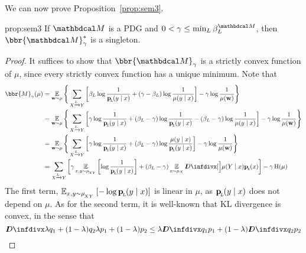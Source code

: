 We can now prove         Proposition~\ref{prop:sem3}.
\begin{old}{prop:sem3}
If $\dg M$ is a PDG and
$0 < \gamma
\leq \min_L \beta_L^{\dg M}$, then
$\bbr{\dg M}_\gamma^*$ is a singleton.
\end{old}

\begin{proof}
It suffices to show that $\bbr{\dg
			  M}_\gamma$ is a strictly convex function of $\mu$,
since every strictly convex function has a unique minimum.
Note that
	\begin{align*}
		\bbr{M}_\gamma(\mu) 
			&= \E_{\mat w \sim \mu} \Bigg\{   \sum_{ X \xrightarrow{\!\!L} Y  } \left[
				\beta_L \log \frac{1}{\bp(y\mid x)} + (\gamma - \beta_L ) \log \frac{1}{\mu(y \mid x)} \right] - \gamma \log \frac{1}{\mu(\mat w)} \Bigg\} \\
			&= \E_{\mat w \sim \mu} \Bigg\{   \sum_{ X \xrightarrow{\!\!L} Y  } \left[ \gamma \log \frac{1}{\bp(y\mid x)} + 
				(\beta_L - \gamma) \log \frac{1}{\bp(y\mid x)} - (\beta_L -\gamma) \log \frac{1}{\mu(y \mid x)} \right] - \gamma \log \frac{1}{\mu(\mat w)} \Bigg\}  \\
			&= \E_{\mat w \sim \mu} \Bigg\{   \sum_{ X \xrightarrow{\!\!L} Y  } \left[ \gamma \log \frac{1}{\bp(y\mid x)} + 
				(\beta_L - \gamma) \log \frac{\mu(y\mid x)}{\bp(y\mid x)} \right] - \gamma \log \frac{1}{\mu(\mat w)} \Bigg\} \\
			&=  \sum_{ X \xrightarrow{\!\!L} Y  } \left[ \gamma \E_{x,y \sim \mu_{\!_{XY}}} \left[\log \frac{1}{\bp(y\mid x)} \right] + 
				(\beta_L - \gamma) \E_{x\sim\mu_X} \kldiv[\Big]{\mu(Y\mid x)}{\bp( x)} \right] - \gamma \H(\mu)
	\end{align*}
	The first term, 
	\( \operatorname*{\mathbb{E}}_{x,y \sim \mu_{\!_{XY}}} \left[-\log {\mathbf{p}_{\!_{L}\!}(y\mid x)}\right] \) 
	is linear in $\mu$, as $\mathbf{p}_{\!_{L}\!}(y\mid x)$ does not depend on $\mu$. %
As for the second term, it is well-known that KL divergence is convex, in the sense that 
	\[ \kldiv{\lambda q_1 + (1-\lambda) q_2 }{ \lambda p_1 + (1-\lambda) p_2} \leq \lambda \kldiv {q_1}{ p_1} + (1-\lambda) \kldiv{q_2}{p_2} \]

\end{proof}
